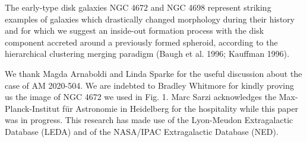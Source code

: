 \documentclass[twocolumns]{aa}
\begin{document}
The early-type disk galaxies NGC 4672 and NGC 4698 represent striking
examples of galaxies which drastically cha\-nged morphology during their
history and for which we suggest an inside-out formation process with
the disk component accreted around a previously formed spheroid,
according to the hierarchical clustering merging paradigm (Baugh et al.
1996; Kauffman 1996).
  
\acknowledgements


We thank Magda Arnaboldi and Linda S\-parke for the useful discussion
about the case of AM 2020-504. We are indebted to
Bradley Whitmore for kindly proving us the image of NGC 4672 
we used in Fig. 1. Marc Sarzi acknowledges the
Max-Planck-Institut f\"ur Astronomie in Heidelberg for the hospitality
while this paper was in progress. This research has made use of the
Lyon-Meudon Extragalactic Database (LEDA) and of the NASA/IPAC
Extragalactic Database (NED).
\end{document}
